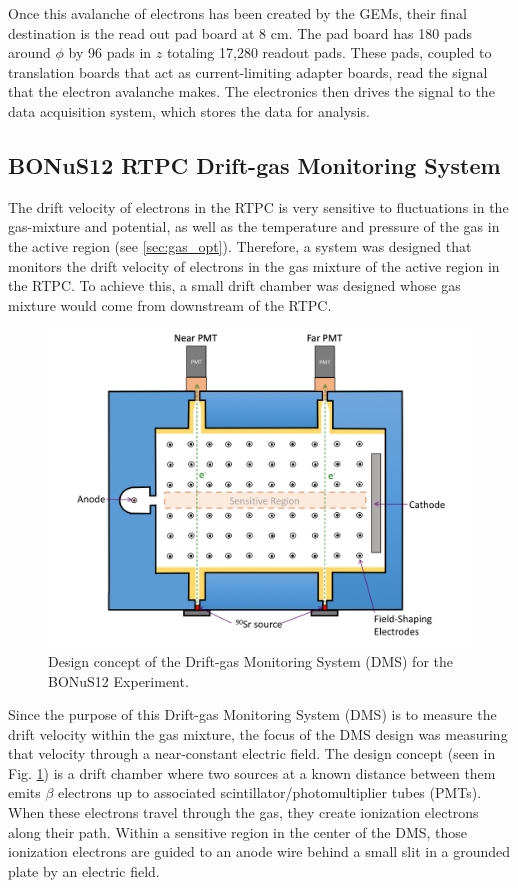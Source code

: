 Once this avalanche of electrons has been created by the GEMs, their final destination is the read out pad board at 8 cm. The pad board has 180 pads around $\phi$ by 96 pads in $z$ totaling 17,280 readout pads. These pads, coupled to translation boards that act as current-limiting adapter boards, read the signal that the electron avalanche makes. The electronics then drives the signal to the data acquisition system, which stores the data for analysis.

\subsection{BONuS12 RTPC Drift-gas Monitoring System}
The drift velocity of electrons in the RTPC is very sensitive to fluctuations in the gas-mixture and potential, as well as the temperature and pressure of the gas in the active region (see \ref{sec:gas_opt}). Therefore, a system was designed that monitors the drift velocity of electrons in the gas mixture of the active region in the RTPC. To achieve this, a small drift chamber was designed whose gas mixture would come from downstream of the RTPC.

\begin{figure}[h!]
	\centering
	\includegraphics[width=0.8\linewidth]{figures/dms_concept.png}
	\caption{Design concept of the Drift-gas Monitoring System (DMS) for the BONuS12 Experiment.}
	\label{fig:dms_concept}
\end{figure}

Since the purpose of this Drift-gas Monitoring System (DMS) is to measure the drift velocity within the gas mixture, the focus of the DMS design was measuring that velocity through a near-constant electric field. The design concept (seen in Fig. \ref{fig:dms_concept}) is a drift chamber where two sources at a known distance between them emits $\beta$ electrons up to associated scintillator/photomultiplier tubes (PMTs). When these electrons travel through the gas, they create ionization electrons along their path. Within a sensitive region in the center of the DMS, those ionization electrons are guided to an anode wire behind a small slit in a grounded plate by an electric field. 

